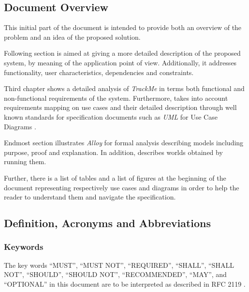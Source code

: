\documentclass[a4paper]{article}
\begin{document}
    \subsection{Document Overview}
        This initial part of the document is intended to provide both an overview of the problem and an idea of the proposed solution.
        
        Following section is aimed at giving a more detailed description of the proposed system, by meaning of the application point of view. Additionally, it addresses functionality, user characteristics, dependencies and constraints.
        
        Third chapter shows a detailed analysis of \textit{TrackMe} in terms both functional and non-functional requirements of the system. Furthermore, takes into account requirements mapping on use cases and their detailed description through well known standards for specification documents such as \textit{UML} for Use Case Diagrams \cite{rumbaugh2004unified}.
        
        Endmost section illustrates \textit{Alloy} for formal analysis \cite{jackson2006software} describing models including purpose, proof and explanation. In addition, describes worlds obtained by running them.
        
        Further, there is a list of tables and a list of figures at the beginning of the document representing respectively use cases and diagrams in order to help the reader to understand them and navigate the specification.
        
    \subsection{Definition, Acronyms and  Abbreviations}
            \subsubsection{Keywords}
            The key words “MUST”, “MUST NOT”, “REQUIRED”, “SHALL”, “SHALL NOT”, “SHOULD”, “SHOULD NOT”, “RECOMMENDED”, “MAY”, and “OPTIONAL” in this document are to be interpreted as described in RFC 2119 \cite{bradner1997key}.
\end{document}
